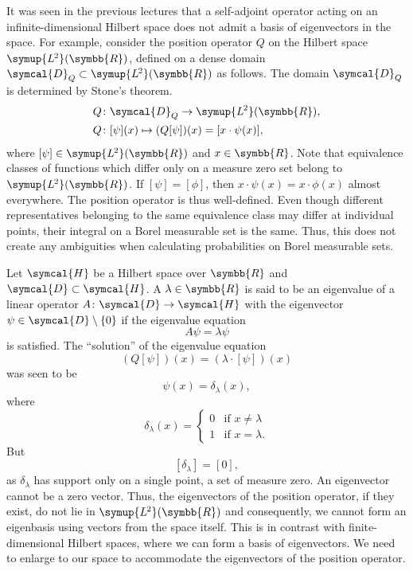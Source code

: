 \documentclass[12pt, a4 paper]{article}
\theoremstyle{definition}
\newcommand{\ltwo}{\symup{L\kern-0.5pt^2}}
\newcommand{\position}{Q}
\newcommand{\rr}{\symbb{R}}
\newcommand{\dirac}{\delta}
\newcommand{\hilbert}{\symcal{H}}
\newcommand{\ltwor}{\ltwo(\rr)}
\newcommand{\domain}{\symcal{D}}
\begin{document}
    It was seen in the previous lectures that a self-adjoint operator acting on an infinite-dimensional Hilbert space does not admit a basis of eigenvectors in the space. For example, consider the position operator $\position$ on the Hilbert space \(\ltwor\), defined on a dense domain \(\domain_{\position} \subset \ltwor\) as follows. The domain $\domain_{\position}$ is determined by Stone's  theorem.
    \begin{align*}
        \position &\colon \domain_\position \rightarrow \ltwor,\\
        \position &\colon [\psi](x) \mapsto (\position[\psi])(x) = [x \cdot \psi(x)],
    \end{align*}
    where \([\psi] \in \ltwor\) and \(x \in \rr\). Note that equivalence classes of functions which differ only on a measure zero set belong to \(\ltwor\). If $[\psi] = [\phi]$, then $x \cdot \psi(x) = x \cdot \phi(x)$ almost everywhere. The position operator is thus well-defined. Even though different representatives belonging to the same equivalence class may differ at individual points, their integral on a Borel measurable set is the same. Thus, this does not create any ambiguities when calculating probabilities on Borel measurable sets.

    Let $\hilbert$ be a Hilbert space over $\rr$ and $\domain \subset \hilbert$. A $\lambda \in \rr$ is said to be an eigenvalue of a linear operator $A \colon \domain \rightarrow \hilbert$ with the eigenvector $\psi \in \domain\setminus\{0\}$ if the eigenvalue equation
    \[A\psi = \lambda \psi\]
    is satisfied.
    The ``solution'' of the eigenvalue equation
    \[(\position[\psi])(x) = (\lambda\cdot[\psi])(x)\]
    was seen to be
    \[\psi(x) = \dirac_\lambda(x),\]
    where
    \[\dirac_\lambda(x) =
    \begin{cases}
        0 & \text{if $x \neq \lambda$}\\
        1 & \text{if $x = \lambda$}.
    \end{cases}
    \]
    But \[[\dirac_\lambda] = [0],\] as $\dirac_\lambda$ has support only on a single point, a set of measure zero. An eigenvector cannot be a zero vector. Thus, the eigenvectors of the position operator, if they exist, do not lie in $\ltwor$ and consequently, we cannot form an eigenbasis using vectors from the space itself. This is in contrast with finite-dimensional Hilbert spaces, where we can form a basis of eigenvectors. We need to enlarge to our space to accommodate the eigenvectors of the position operator.
\end{document}
